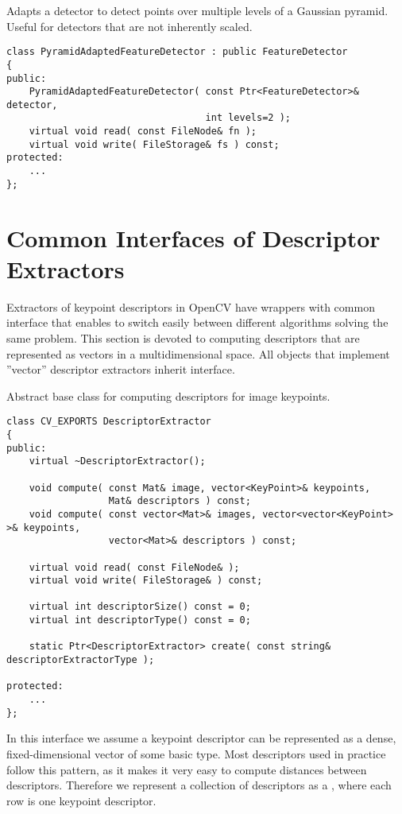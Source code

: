Adapts a detector to detect points over multiple levels of a Gaussian
pyramid. Useful for detectors that are not inherently scaled.

\begin{lstlisting}
class PyramidAdaptedFeatureDetector : public FeatureDetector
{
public:
    PyramidAdaptedFeatureDetector( const Ptr<FeatureDetector>& detector, 
                                   int levels=2 );
    virtual void read( const FileNode& fn );
    virtual void write( FileStorage& fs ) const;
protected:
    ...
};
\end{lstlisting}



\section{Common Interfaces of Descriptor Extractors}
Extractors of keypoint descriptors in OpenCV have wrappers with common interface that enables to switch easily 
between different algorithms solving the same problem. This section is devoted to computing descriptors 
that are represented as vectors in a multidimensional space. All objects that implement ''vector'' 
descriptor extractors inherit  interface.

Abstract base class for computing descriptors for image keypoints.

\begin{lstlisting}
class CV_EXPORTS DescriptorExtractor
{
public:
    virtual ~DescriptorExtractor();

    void compute( const Mat& image, vector<KeyPoint>& keypoints, 
                  Mat& descriptors ) const;
    void compute( const vector<Mat>& images, vector<vector<KeyPoint> >& keypoints, 
                  vector<Mat>& descriptors ) const;

    virtual void read( const FileNode& );
    virtual void write( FileStorage& ) const;

    virtual int descriptorSize() const = 0;
    virtual int descriptorType() const = 0;
    
    static Ptr<DescriptorExtractor> create( const string& descriptorExtractorType );

protected:
    ...
};
\end{lstlisting}

In this interface we assume a keypoint descriptor can be represented as a
dense, fixed-dimensional vector of some basic type. Most descriptors used
in practice follow this pattern, as it makes it very easy to compute
distances between descriptors. Therefore we represent a collection of
descriptors as a , where each row is one keypoint descriptor.

